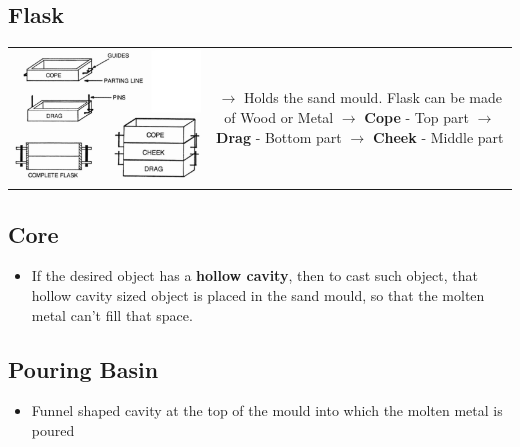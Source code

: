 \documentclass[8pt]{report}
\begin{document}
	\subsection{Flask}
		\begin{table}[H]
			\begin{tabular}{cc}
				\parbox{6cm}{\includegraphics[scale=0.4]{flask.png}} &
				\parbox{15cm}{$\rightarrow$ Holds the sand mould. Flask can be made of Wood or Metal\\\\ $\rightarrow$ \textbf{Cope} - Top part\\\\ $\rightarrow$ \textbf{Drag} - Bottom part\\\\ $\rightarrow$ \textbf{Cheek} - Middle part}
			\end{tabular}
		\end{table}
	\subsection{Core}
		\begin{itemize}
			\item If the desired object has a \textbf{hollow cavity}, then to cast such object, that hollow cavity sized object is placed in the sand mould, so that the molten metal can't fill that space. 
		\end{itemize}
	\subsection{Pouring Basin}
		\begin{itemize}
			\item Funnel shaped cavity at the top of the mould into which the molten metal is poured
		\end{itemize}
\end{document}
